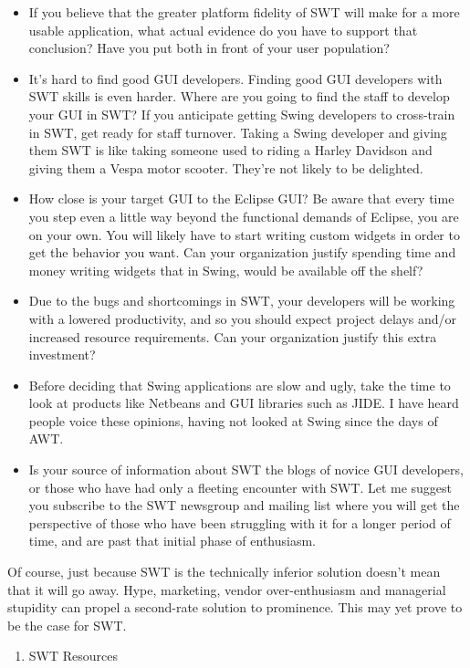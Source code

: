 \documentclass{article}
\begin{document}
\begin{enumerate}
\begin{itemize}
\item If you believe that the greater platform fidelity of SWT will make
for a more usable application, what actual evidence do you have to
support that conclusion? Have you put both in front of your user
population?
\item It's hard to find good GUI developers. Finding good GUI developers
with SWT skills is even harder. Where are you going to find the staff
to develop your GUI in SWT? If you anticipate getting Swing
developers to cross-train in SWT, get ready for staff turnover.
Taking a Swing developer and giving them SWT is like taking someone
used to riding a Harley Davidson and giving them a Vespa motor
scooter. They're not likely to be delighted.
\item How close is your target GUI to the Eclipse GUI? Be aware that every
time you step even a little way beyond the functional demands of
Eclipse, you are on your own. You will likely have to start writing
custom widgets in order to get the behavior you want. Can your
organization justify spending time and money writing widgets that in
Swing, would be available off the shelf?
\item Due to the bugs and shortcomings in SWT, your developers will be
working with a lowered productivity, and so you should expect project
delays and/or increased resource requirements. Can your organization
justify this extra investment?
\item Before deciding that Swing applications are slow and ugly, take the
time to look at products like Netbeans and GUI libraries such as
JIDE. I have heard people voice these opinions, having not looked at
Swing since the days of AWT.
\item Is your source of information about SWT the blogs of novice GUI
developers, or those who have had only a fleeting encounter with SWT.
Let me suggest you subscribe to the SWT newsgroup and mailing list
where you will get the perspective of those who have been struggling
with it for a longer period of time, and are past that initial phase
of enthusiasm.
\end{itemize}

Of course, just because SWT is the technically inferior solution doesn't
mean that it will go away. Hype, marketing, vendor over-enthusiasm and
managerial stupidity can propel a second-rate solution to prominence.
This may yet prove to be the case for SWT.

\begin{enumerate}
\item SWT Resources
\label{sec:orgheadline298}


\end{enumerate}
\end{enumerate}
\end{document}
